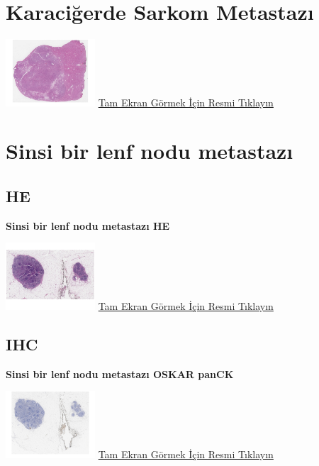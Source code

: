 \documentclass[
  letterpaper,
  DIV=11,
  numbers=noendperiod]{scrreprt}
\begin{document}
\hypertarget{sec-karaciger-sarkom-metastaz}{%
\section{Karaciğerde Sarkom
Metastazı}\label{sec-karaciger-sarkom-metastaz}}

\href{https://images.patolojiatlasi.com/metastaticsarcoma/HE.html}{\includegraphics[width=0.25\textwidth,height=\textheight]{./screenshots/thumbnail_metastaticsarcoma.png}}
\href{https://images.patolojiatlasi.com/metastaticsarcoma/HE.html}{Tam
Ekran Görmek İçin Resmi Tıklayın}

\hypertarget{sec-sinsi-lenf-nodu-metastazi}{%
\section{Sinsi bir lenf nodu
metastazı}\label{sec-sinsi-lenf-nodu-metastazi}}

\hypertarget{he-7}{%
\subsection{HE}\label{he-7}}

\textbf{Sinsi bir lenf nodu metastazı HE}

\href{https://images.patolojiatlasi.com/insidious-lymph-node-metastasis/HE.html}{\includegraphics[width=0.25\textwidth,height=\textheight]{./screenshots/thumbnail_insidious-lymph-node-metastasis.png}}
\href{https://images.patolojiatlasi.com/insidious-lymph-node-metastasis/HE.html}{Tam
Ekran Görmek İçin Resmi Tıklayın}

\hypertarget{ihc-1}{%
\subsection{IHC}\label{ihc-1}}

\textbf{Sinsi bir lenf nodu metastazı OSKAR panCK}

\href{https://images.patolojiatlasi.com/insidious-lymph-node-metastasis/HE.html}{\includegraphics[width=0.25\textwidth,height=\textheight]{./screenshots/thumbnail_insidious-lymph-node-metastasis-OSKARCK.png}}
\href{https://images.patolojiatlasi.com/insidious-lymph-node-metastasis/OSKARCK.html}{Tam
Ekran Görmek İçin Resmi Tıklayın}
\end{document}
